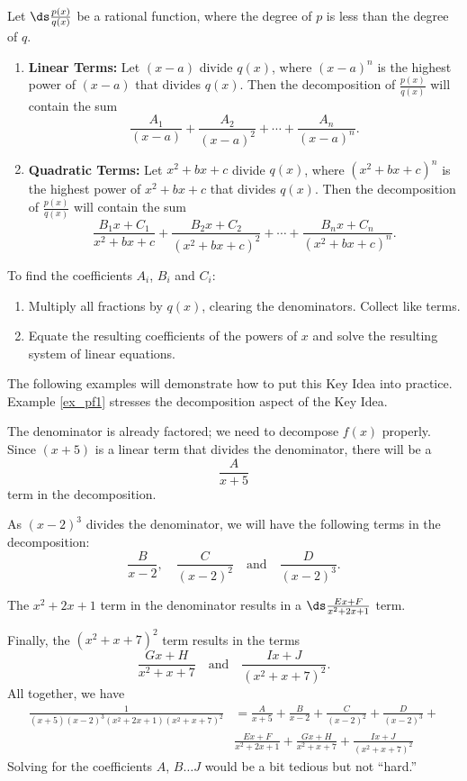 {Let $\ds \frac{p(x)}{q(x)}$ be a rational function, where the degree of $p$ is less than the degree of $q$.
\begin{enumerate}
	\item	\textbf{Linear Terms:} Let $(x-a)$ divide $q(x)$, where $(x-a)^n$ is the highest power of $(x-a)$ that divides $q(x)$. Then the decomposition of $\frac{p(x)}{q(x)}$ will contain the sum
	$$\frac{A_1}{(x-a)} + \frac{A_2}{(x-a)^2} + \cdots +\frac{A_n}{(x-a)^n}.$$
	\item		\textbf{Quadratic Terms:} Let $x^2+bx+c$ divide $q(x)$, where $(x^2+bx+c)^n$ is the highest power of $x^2+bx+c$ that divides $q(x)$. Then the decomposition of $\frac{p(x)}{q(x)}$ will contain the sum 
	$$\frac{B_1x+C_1}{x^2+bx+c}+\frac{B_2x+C_2}{(x^2+bx+c)^2}+\cdots+\frac{B_nx+C_n}{(x^2+bx+c)^n}.$$
	\end{enumerate}
	To find the coefficients $A_i$, $B_i$ and $C_i$:
	\begin{enumerate}
	\item	Multiply all fractions by $q(x)$, clearing the denominators. Collect like terms.
	\item		Equate the resulting coefficients of the powers of $x$ and solve the resulting system of linear equations.
	\end{enumerate}
}

The following examples will demonstrate how to put this Key Idea into practice. Example \ref{ex_pf1} stresses the decomposition aspect of the Key Idea.\\

{The denominator is already factored; we need to decompose $f(x)$ properly. Since $(x+5)$ is a linear term that divides the denominator, there will be a $$\frac{A}{x+5}$$ term in the decomposition.

As $(x-2)^3$ divides the denominator, we will have the following terms in the decomposition:
$$\frac{B}{x-2},\quad \frac{C}{(x-2)^2}\quad \text{and}\quad \frac{D}{(x-2)^3}.$$

The $x^2+2x+1$ term in the denominator results in a $\ds\frac{Ex+F}{x^2+2x+1}$ term.

Finally, the $(x^2+x+7)^2$ term results in the terms $$\frac{Gx+H}{x^2+x+7}\quad \text{and}\quad \frac{Ix+J}{(x^2+x+7)^2}.$$
All together, we have 
\begin{align*}
\frac{1}{(x+5)(x-2)^3(x^2+2x+1)(x^2+x+7)^2} &= \frac{A}{x+5} + \frac{B}{x-2}+ \frac{C}{(x-2)^2}+\frac{D}{(x-2)^3}+ \\
		& \frac{Ex+F}{x^2+2x+1}+\frac{Gx+H}{x^2+x+7}+\frac{Ix+J}{(x^2+x+7)^2}
\end{align*}
Solving for the coefficients $A$, $B \ldots J$ would be a bit tedious but not ``hard.''
}\\

